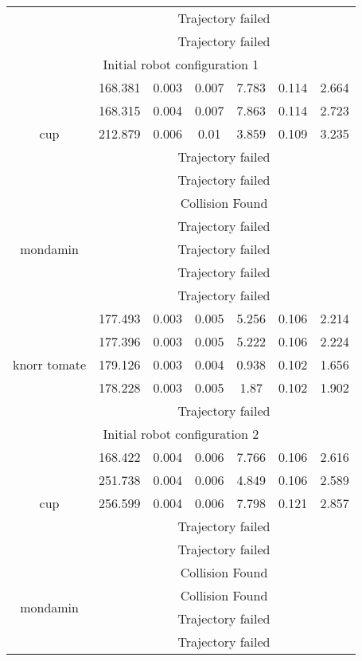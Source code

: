 {\begin{center}
\begin{longtable}[c]{ | c | c | c | c | c | c || c || }
& \multicolumn{6}{c|}{Trajectory failed} \\ 
& \multicolumn{6}{c|}{Trajectory failed} \\ 
\hline
\multicolumn{7}{|c|}{Initial robot configuration 1} \\
\hline
\multirow{5}{1.7cm}{cup}& 168.381 & 0.003 & 0.007 & 7.783 & 0.114 & 2.664 \\ 
& 168.315 & 0.004 & 0.007 & 7.863 & 0.114 & 2.723 \\ 
& 212.879 & 0.006 & 0.01 & 3.859 & 0.109 & 3.235 \\ 
& \multicolumn{6}{c|}{Trajectory failed} \\ 
& \multicolumn{6}{c|}{Trajectory failed} \\ 
\hline\multirow{5}{1.7cm}{mondamin}& \multicolumn{6}{c|}{Collision Found} \\ 
& \multicolumn{6}{c|}{Trajectory failed} \\ 
& \multicolumn{6}{c|}{Trajectory failed} \\ 
& \multicolumn{6}{c|}{Trajectory failed} \\ 
& \multicolumn{6}{c|}{Trajectory failed} \\ 
\hline\multirow{5}{1.7cm}{knorr tomate}& 177.493 & 0.003 & 0.005 & 5.256 & 0.106 & 2.214 \\ 
& 177.396 & 0.003 & 0.005 & 5.222 & 0.106 & 2.224 \\ 
& 179.126 & 0.003 & 0.004 & 0.938 & 0.102 & 1.656 \\ 
& 178.228 & 0.003 & 0.005 & 1.87 & 0.102 & 1.902 \\ 
& \multicolumn{6}{c|}{Trajectory failed} \\ 
\hline
\multicolumn{7}{|c|}{Initial robot configuration 2} \\
\hline
\multirow{5}{1.7cm}{cup}& 168.422 & 0.004 & 0.006 & 7.766 & 0.106 & 2.616 \\ 
& 251.738 & 0.004 & 0.006 & 4.849 & 0.106 & 2.589 \\ 
& 256.599 & 0.004 & 0.006 & 7.798 & 0.121 & 2.857 \\ 
& \multicolumn{6}{c|}{Trajectory failed} \\ 
& \multicolumn{6}{c|}{Trajectory failed} \\ 
\hline\multirow{5}{1.7cm}{mondamin}& \multicolumn{6}{c|}{Collision Found} \\ 
& \multicolumn{6}{c|}{Collision Found} \\ 
& \multicolumn{6}{c|}{Trajectory failed} \\ 
& \multicolumn{6}{c|}{Trajectory failed} \\ 

\end{longtable}
\end{center}}
